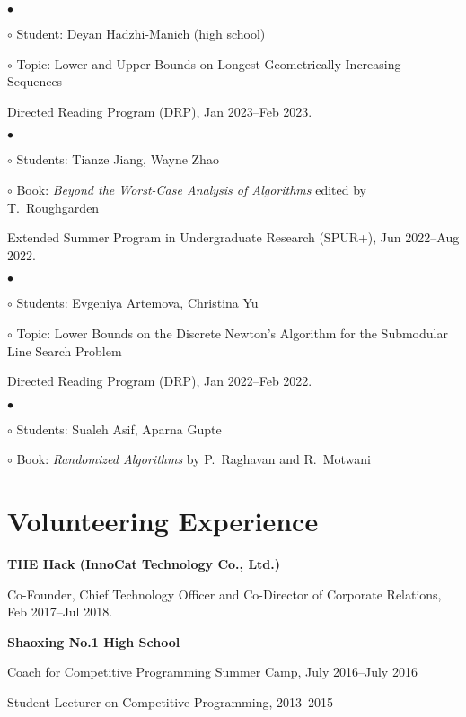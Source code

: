 \documentclass[margin,line]{res}
\newenvironment{list1}{
  \begin{list}{\ding{113}}{%
      \setlength{\itemsep}{0in}
      \setlength{\parsep}{0.025in} \setlength{\parskip}{0in}
      \setlength{\topsep}{0in} \setlength{\partopsep}{0in}
      \setlength{\leftmargin}{0.17in}}}{\end{list}}
\newenvironment{list2}{
  \begin{list}{$\bullet$}{%
      \setlength{\itemsep}{0in}
      \setlength{\parsep}{0in} \setlength{\parskip}{0in}
      \setlength{\topsep}{0in} \setlength{\partopsep}{0in}
      \setlength{\leftmargin}{0.2in}}}{\end{list}}
\newenvironment{list3}{
  \begin{list}{\ding{113}}{%
      \setlength{\itemsep}{0.05in}
      \setlength{\parsep}{0.025in} \setlength{\parskip}{0in}
      \setlength{\topsep}{0in} \setlength{\partopsep}{0in}
      \setlength{\leftmargin}{0.17in}}}{\end{list}}
\begin{document}
\begin{resume}
\begin{list3}
\begin{list2}
  \item[$\circ$] Student: Deyan Hadzhi-Manich (high school)
  \item[$\circ$] Topic: Lower and Upper Bounds on Longest Geometrically Increasing Sequences
  \end{list2}
\item[] Directed Reading Program (DRP), Jan 2023--Feb 2023.
  \begin{list2}
  \item[$\circ$] Students: Tianze Jiang, Wayne Zhao
  \item[$\circ$] Book: \emph{Beyond the Worst-Case Analysis of Algorithms} edited by T.\ Roughgarden
  \end{list2}
\item[] Extended Summer Program in Undergraduate Research (SPUR+), Jun 2022--Aug 2022.
  \begin{list2}
  \item[$\circ$] Students: Evgeniya Artemova, Christina Yu
  \item[$\circ$] Topic: Lower Bounds on the Discrete Newton's Algorithm for the Submodular Line Search Problem
  \end{list2}
\item[] Directed Reading Program (DRP), Jan 2022--Feb 2022.
  \begin{list2}
  \item[$\circ$] Students: Sualeh Asif, Aparna Gupte
  \item[$\circ$] Book: \emph{Randomized Algorithms} by P.\ Raghavan and R.\ Motwani
  \end{list2}
\end{list3}

\section{\sc Volunteering Experience}

{\bf THE Hack (InnoCat Technology Co., Ltd.)}\\
\vspace*{-.1in}
\begin{list1}
\item[] Co-Founder, Chief Technology Officer and Co-Director of Corporate Relations, Feb 2017--Jul 2018.
\end{list1}

{\bf Shaoxing No.1 High School}\\
\vspace*{-.1in}
\begin{list1}
\item[] Coach for Competitive Programming Summer Camp, July 2016--July 2016
\item[] Student Lecturer on Competitive Programming, 2013--2015
\end{list1}



\end{resume}
\end{document}
